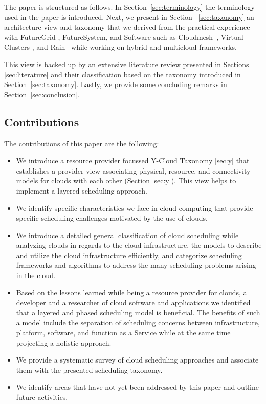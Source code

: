 \documentclass[final,5p,times,twocolumn]{elsarticle}
\begin{document}
The paper is structured as follows. In Section~\ref{sec:terminology} the terminology used in the paper is introduced. Next, we present in Section ~\ref{sec:taxonomy} an architecture view and taxonomy that we derived from the practical experience with FutureGrid \cite{las12fg-bookchapter,fox2013futuregrid}, FutureSystem, and Software such as Cloudmesh~\cite{von2014accessing}, Virtual Clusters \cite{las-comet}, and Rain~\cite{las-fg-1295,las10dynamic,las-rain} while working on hybrid and multicloud frameworks.

This view is backed up by an extensive literature review presented in Sections \ref{sec:literature} and their classification based on the taxonomy introduced in Section~\ref{sec:taxonomy}. Lastly, we provide some concluding remarks in Section~\ref{sec:conclusion}.


\subsection{Contributions}

The contributions of this paper are the following:

\begin{itemize}
 
\item We introduce a resource provider focussed Y-Cloud Taxonomy \ref{sec:y} that establishes a provider view associating physical, resource, and connectivity models for clouds with each other (Section \ref{sec:y}). This view helps to implement a layered scheduling approach.

\item We identify specific characteristics we face in cloud computing that provide specific scheduling challenges motivated by the use of clouds.

\item We introduce a detailed general classification of cloud scheduling while analyzing clouds in regards to the cloud infrastructure, the models to describe and utilize the cloud infrastructure efficiently, and categorize scheduling frameworks and algorithms to address the many scheduling problems arising in the cloud.

\item Based on the lessons learned while being a resource provider for clouds, a developer and a researcher of cloud software and applications we identified that a layered and phased scheduling model is beneficial. The benefits of such a model include the separation of scheduling concerns between infrastructure, platform, software, and function as a Service while at the same time projecting a holistic approach.

\item We provide a systematic survey of cloud scheduling approaches and associate them with the presented scheduling taxonomy.

\item We identify areas that have not yet been addressed by this paper and outline future activities.
\end{itemize}
\end{document}
